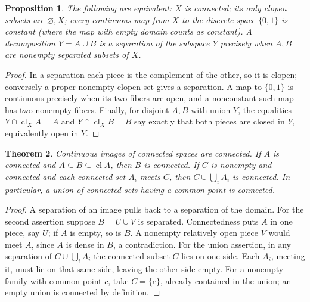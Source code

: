 \documentclass[11pt,oneside,openany]{book}
\newtheorem{theorem}{Theorem}[chapter]
\newtheorem{proposition}[theorem]{Proposition}
\theoremstyle{definition}
\theoremstyle{remark}
\DeclareMathOperator{\cl}{cl}
\begin{document}
\begin{proposition}\label{d10:06:separation-tests}
The following are equivalent: $X$ is connected; its only clopen subsets are $\varnothing,X$; every continuous map from $X$ to the discrete space $\{0,1\}$ is constant (where the map with empty domain counts as constant). A decomposition $Y=A\cup B$ is a separation of the subspace $Y$ precisely when $A,B$ are nonempty separated subsets of $X$.
\end{proposition}
\begin{proof}
In a separation each piece is the complement of the other, so it is clopen; conversely a proper nonempty clopen set gives a separation. A map to $\{0,1\}$ is continuous precisely when its two fibers are open, and a nonconstant such map has two nonempty fibers. Finally, for disjoint $A,B$ with union $Y$, the equalities $Y\cap\cl_X A=A$ and $Y\cap\cl_X B=B$ say exactly that both pieces are closed in $Y$, equivalently open in $Y$.
\end{proof}

\begin{theorem}\label{d10:06:permanence}
Continuous images of connected spaces are connected. If $A$ is connected and $A\subseteq B\subseteq\cl A$, then $B$ is connected. If $C$ is nonempty and connected and each connected set $A_i$ meets $C$, then $C\cup\bigcup_iA_i$ is connected. In particular, a union of connected sets having a common point is connected.
\end{theorem}
\begin{proof}
A separation of an image pulls back to a separation of the domain. For the second assertion suppose $B=U\cup V$ is separated. Connectedness puts $A$ in one piece, say $U$; if $A$ is empty, so is $B$. A nonempty relatively open piece $V$ would meet $A$, since $A$ is dense in $B$, a contradiction. For the union assertion, in any separation of $C\cup\bigcup_iA_i$ the connected subset $C$ lies on one side. Each $A_i$, meeting it, must lie on that same side, leaving the other side empty. For a nonempty family with common point $c$, take $C=\{c\}$, already contained in the union; an empty union is connected by definition.
\end{proof}
\end{document}
